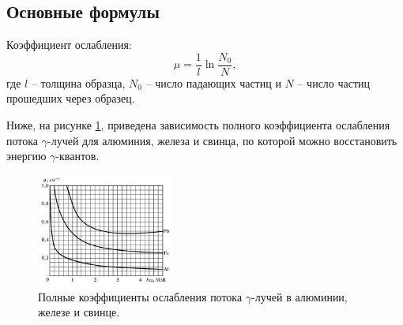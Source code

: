 \subsection*{Основные формулы}

Коэффициент ослабления:
\begin{equation}
    \mu = \frac{1}{l} \ln \frac{N_0}{N},
    \label{base}
\end{equation}
где $l$ -- толщина образца, $N_0$ -- число падающих частиц и $N$ -- число частиц прошедших через образец.

Ниже, на рисунке \ref{fig:3}, приведена зависимость полного коэффициента ослабления потока $\gamma$-лучей для алюминия, железа и свинца, по которой можно восстановить энергию $\gamma$-квантов.


\begin{figure}[h]
    \centering
    \includegraphics[width=0.4\textwidth]{figures/plot_lab.png}
    \caption{Полные коэффициенты ослабления потока $\gamma$-лучей в алюминии, железе и свинце.}
    \label{fig:3}
\end{figure}
